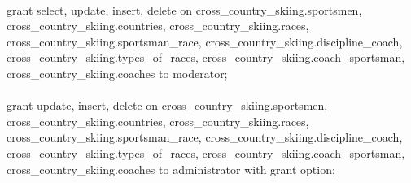 \documentclass[a4paper,12pt]{article}
\begin{document}
\\
grant select, update, insert, delete on cross\_country\_skiing.sportsmen, cross\_country\_skiing.countries, cross\_country\_skiing.races,\\
\indent cross\_country\_skiing.sportsman\_race, cross\_country\_skiing.discipline\_coach,\\
\indent cross\_country\_skiing.types\_of\_races, cross\_country\_skiing.coach\_sportsman, cross\_country\_skiing.coaches to moderator;\\
\\
grant update, insert, delete on cross\_country\_skiing.sportsmen, cross\_country\_skiing.countries, cross\_country\_skiing.races,\\
\indent cross\_country\_skiing.sportsman\_race, cross\_country\_skiing.discipline\_coach,\\
\indent cross\_country\_skiing.types\_of\_races, cross\_country\_skiing.coach\_sportsman, cross\_country\_skiing.coaches to administrator with grant option;\\
\\
\end{document}
